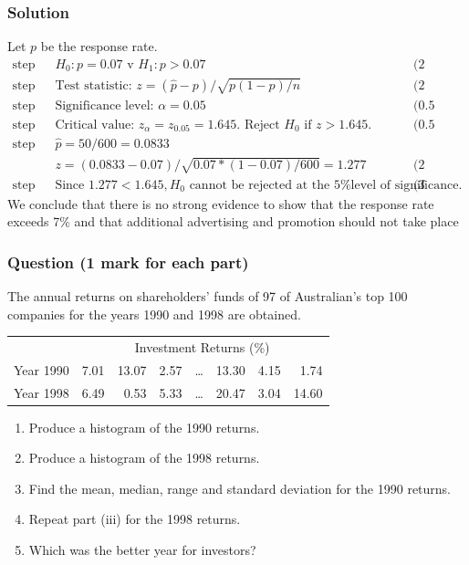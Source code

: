 \documentclass[a4paper,oneside]{book}
\begin{document}
\subsubsection*{Solution}
Let $p$ be the response rate.
\begin{align*}
  \text{step 1. } &  H_0 : p = 0.07 \text{ v } H_1 : p > 0.07 & \text{(2
    marks)} \\
  \text{step 2. } & \text{Test statistic: } z = (\hat{p} - p)/\sqrt{p(1
    - p)/n} & \text{(2 marks)} \\
  \text{step 3. } & \text{Significance level: } \alpha = 0.05 &
  \text{(0.5 marks)} \\
  \text{step 4. } & \text{Critical value: } z_{\alpha} = z_{0.05} =
  1.645. \text{ Reject } H_0 \text{ if } z > 1.645. & \text{(0.5
    marks)} \\
  \text{step 5. } & \hat{p} = 50/600 = 0.0833 &  \\
                 & z = (0.0833 - 0.07)/\sqrt{0.07*(1-0.07)/600} =
                 1.277 & \text{(2 marks)} \\ 
  \text{step 6. } & \text{Since } 1.277 < 1.645, H_0 \text{ cannot be
    rejected at the 5\% level of significance}. & \text{(3 marks)}
\end{align*}
We conclude that there is no strong evidence to show that the response
rate exceeds 7\% and that additional advertising and promotion should
not take place


\subsubsection*{Question (1 mark for each part)}

The annual returns on shareholders' funds of 97 of Australian's top
100 companies for the years 1990 and 1998 are obtained.
\begin{center}
\begin{tabular}{lrrrrrrr}
  & \multicolumn{7}{c}{Investment Returns (\%)} \\
  Year 1990 & 7.01 & 13.07 & 2.57 & \ldots & 13.30 & 4.15 & 1.74 \\
  Year 1998 & 6.49 & 0.53  & 5.33 & \ldots & 20.47 & 3.04 & 14.60 \\
\end{tabular}
\end{center}
\begin{enumerate}
\item Produce a histogram of the 1990 returns.
\item Produce a histogram of the 1998 returns.
\item Find the mean, median, range and standard deviation for the 1990 returns.
\item Repeat part (iii) for the 1998 returns.
\item Which was the better year for investors?
\end{enumerate}
\end{document}
